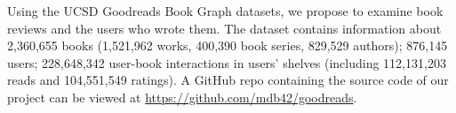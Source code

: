 Using the UCSD Goodreads Book Graph datasets, we propose to examine book reviews and
the users who wrote them. The dataset contains information about 2,360,655 books
(1,521,962 works, 400,390 book series, 829,529 authors); 876,145 users; 228,648,342
user-book interactions in users' shelves (including 112,131,203 reads and 104,551,549
ratings). A GitHub repo containing the source code of our project can be viewed at
\href{https://github.com/mdb42/goodreads}{https://github.com/mdb42/goodreads}.